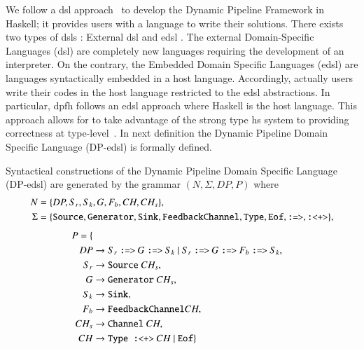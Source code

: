 \fi
%
We follow a \acrfull{dsl} approach~\cite{Fowler10} to develop the Dynamic Pipeline Framework in Haskell; it  provides users with a language to write their solutions. There exists two types of \acrlong{dsl}s \cite{dsl}: External \acrfull{dsl} and \acrfull{edsl} \cite{dsel}. The external Domain-Specific Languages (\acrshort{dsl})  are completely new languages requiring the de\-ve\-lop\-ment of an interpreter. On the contrary, the Embedded Domain Specific Languages (\acrshort{edsl}) are languages syntactically embedded in a host language.
Accordingly, actually users write their codes in the host language restricted to the \acrshort{edsl} abstractions. In particular, \acrshort{dpfh} follows an \acrshort{edsl} approach where Haskell is the host language. This approach allows for to take  advantage of the strong type \acrshort{hs}  system to providing correctness at type-level~\cite{curryhoward}. In next definition the Dynamic Pipeline Domain Specific Language (DP-\acrshort{edsl}) is  formally defined.

\begin{definition}\label{def:cfg:dsl}
Syntactical constructions of the Dynamic Pipeline Domain Specific Language (DP-\acrshort{edsl}) are generated by  the grammar $(N, \Sigma, DP, P)$ where
\begin{equation*}\label{grammar:eq}
      \begin{aligned}
    N &= \{DP,S_r,S_k,G,F_b,CH,CH_s\},\\
    \Sigma &= \{\text{\texttt{Source}},\text{\texttt{Generator}},\text{\texttt{Sink}},\text{\texttt{FeedbackChannel}},\text{\texttt{Type}},\text{\texttt{Eof}},\text{\texttt{:=>}},\text{\texttt{:<+>}}\},
    \end{aligned}
\end{equation*}
\begin{equation*}
    \begin{aligned}
  P = \{\\
  DP  &\rightarrow S_r\ \text{\texttt{:=>}}\ G\ \text{\texttt{:=>}}\ S_k\ |\ S_r\ \text{\texttt{:=>}}\ G\ \text{\texttt{:=>}}\ F_b\ \text{\texttt{:=>}}\ S_k,\\
  S_r &\rightarrow \text{\texttt{Source}}\ CH_s,\\
  G   &\rightarrow \text{\texttt{Generator}}\ CH_s,\\
  S_k &\rightarrow \text{\texttt{Sink}},\\
  F_b &\rightarrow \text{\texttt{FeedbackChannel}} CH,\\
  CH_s &\rightarrow \text{\texttt{Channel}}\ CH,\\
  CH &\rightarrow \text{\texttt{Type :<+>}}\ CH\ |\ \text{\texttt{Eof}}\}
\end{aligned}
\end{equation*}
\end{definition}

